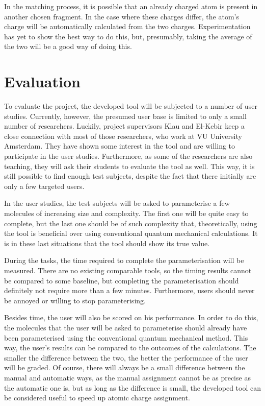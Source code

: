 \noindent
In the matching process, it is possible that an already charged atom is present in another chosen fragment. In the case where these charges differ, the atom's charge will be automatically calculated from the two charges. Experimentation has yet to show the best way to do this, but, presumably, taking the average of the two will be a good way of doing this.


\section{Evaluation}

To evaluate the project, the developed tool will be subjected to a number of user studies. Currently, however, the presumed user base is limited to only a small number of researchers. Luckily, project supervisors Klau and El-Kebir keep a close connection with most of those researchers, who work at VU University Amsterdam. They have shown some interest in the tool and are willing to participate in the user studies. Furthermore, as some of the researchers are also teaching, they will ask their students to evaluate the tool as well. This way, it is still possible to find enough test subjects, despite the fact that there  initially are only a few targeted users.

In the user studies, the test subjects will be asked to parameterise a few molecules of increasing size and complexity. The first one will be quite easy to complete, but the last one should be of such complexity that, theoretically, using the tool is beneficial over using conventional quantum mechanical calculations. It is in these last situations that the tool should show its true value.

During the tasks, the time required to complete the parameterisation will be measured. There are no existing comparable tools, so the timing results cannot be compared to some baseline, but completing the parameterisation should definitely not require more than a few minutes. Furthermore, users should never be annoyed or willing to stop parameterising.

Besides time, the user will also be scored on his performance. In order to do this, the molecules that the user will be asked to parameterise should already have been parameterised using the conventional quantum mechanical method. This way, the user's results can be compared to the outcomes of the calculations. The smaller the difference between the two, the better the performance of the user will be graded. Of course, there will always be a small difference between the manual and automatic ways, as the manual assignment cannot be as precise as the automatic one is, but as long as the difference is small, the developed tool can be considered useful to speed up atomic charge assignment.

